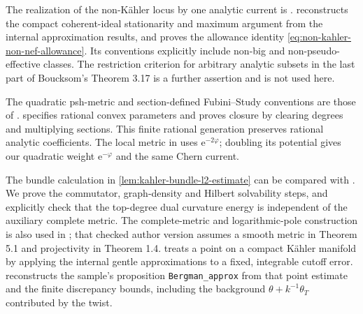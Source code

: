 The realization of the non-K\"ahler locus by one analytic current is \cite[Definition 3.16 and Theorem 3.17, pp.~59--60]{Bou04}.  reconstructs the compact coherent-ideal stationarity and maximum argument from the internal approximation results, and proves the allowance identity \eqref{eq:non-kahler-non-nef-allowance}. Its conventions explicitly include non-big and non-pseudo-effective classes. The restriction criterion for arbitrary analytic subsets in the last part of Boucksom's Theorem 3.17 is a further assertion and is not used here.

The quadratic psh-metric and section-defined Fubini--Study conventions are those of \cite[Chapter on plurisubharmonic functions, definitions \texttt{Hermmetric}, \texttt{ArcFSmetric} and \texttt{gFSmetric}]{XiaSampleBook}.  specifies rational convex parameters and proves closure by clearing degrees and multiplying sections. This finite rational generation preserves rational analytic coefficients. The local metric in \cite[Section 2.4, pp.~49--50]{Bou04} uses $\mathrm e^{-2\varphi}$; doubling its potential gives our quadratic weight $\mathrm e^{-\varphi}$ and the same Chern current.

The bundle calculation in \cref{lem:kahler-bundle-l2-estimate} can be compared with \cite[Chapter VI, Section 6.1, pp.~304--306, and Chapter VII, Theorem 1.1, Theorem 1.2 and Corollary 1.3, pp.~329--330]{DemBook}. We prove the commutator, graph-density and Hilbert solvability steps, and explicitly check that the top-degree dual curvature energy is independent of the auxiliary complete metric. The complete-metric and logarithmic-pole construction is also used in \cite[Theorem 5.1 and its proof, pp.~18--22]{Hisamoto2012v2}; that checked author version assumes a smooth metric in Theorem 5.1 and projectivity in Theorem 1.4.  treats a point on a compact K\"ahler manifold by applying the internal gentle approximations to a fixed, integrable cutoff error.  reconstructs the sample's proposition \texttt{Bergman\_approx} from that point estimate and the finite discrepancy bounds, including the background $\theta+k^{-1}\theta_T$ contributed by the twist.


